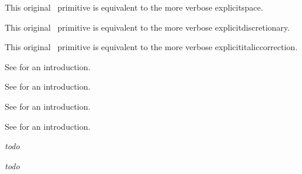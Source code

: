 \stopsection


\startsection[title=Primitives]

\startoldprimitive[title={\prm {<space>}}]

This original \TEX\ primitive is equivalent to the more verbose \prm
{explicitspace}.

\stopoldprimitive

\startoldprimitive[title={\prm {-}}]

This original \TEX\ primitive is equivalent to the more verbose \prm
{explicitdiscretionary}.

\stopoldprimitive

\startoldprimitive[title={\prm {/}}]

This original \TEX\ primitive is equivalent to the more verbose \prm
{explicititaliccorrection}.

\stopoldprimitive

\startnewprimitive[title={\prm {Uabove}}]

See  for an introduction.

\stopnewprimitive

\startnewprimitive[title={\prm {Uabovewithdelims}}]

See  for an introduction.

\stopnewprimitive

\startnewprimitive[title={\prm {Uatop}}]

See  for an introduction.

\stopnewprimitive

\startnewprimitive[title={\prm {Uatopwithdelims}}]

See  for an introduction.

\stopnewprimitive

\startnewprimitive[title={\prm {Udelcode}}]

{\em todo} 

\stopnewprimitive

\startnewprimitive[title={\prm {Udelimited}}]

{\em todo} 

\stopnewprimitive

\startnewprimitive[title={\prm {Udelimiter}}]

